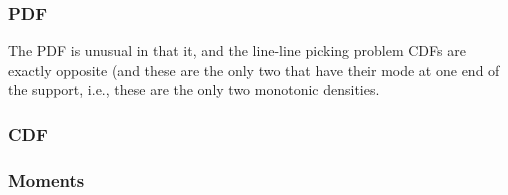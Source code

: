 \subsubsection{PDF}



The PDF is unusual in that it, and the line-line picking problem CDFs
are exactly opposite (and these are the only two that have their mode
at one end of the support, i.e., these are the only two monotonic
densities.

\subsubsection{CDF}


\subsubsection{Moments}

